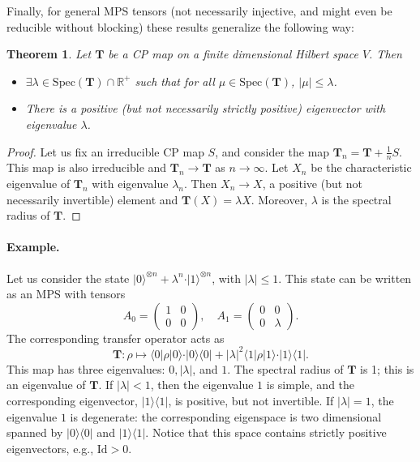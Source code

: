 \documentclass{article}
\newtheorem{theorem}{Theorem}
\newcommand{\id}{\mathrm{Id}}
\newcommand{\ket}[1]{\vert #1 \rangle}
\newcommand{\bra}[1]{\langle #1 \vert}
\begin{document}
Finally, for general MPS tensors (not necessarily injective, and might even be reducible without blocking) these results generalize the  following way:
\begin{theorem}
  Let $\mathbf{T}$ be a CP map on a finite dimensional Hilbert space $V$. Then 
  \begin{itemize}
  \item  $\exists \lambda\in \mathrm{Spec}(\mathbf{T})\cap \mathbb{R}^+$ such that for all $\mu\in \mathrm{Spec}(\mathbf{T})$, $|\mu|\leq \lambda$. 
  \item  There is a positive (but not necessarily strictly positive) eigenvector with eigenvalue $\lambda$. 
  \end{itemize}
\end{theorem}
\begin{proof}
  Let us fix an irreducible CP map $S$, and consider the map $\mathbf{T}_n = \mathbf{T}+\tfrac{1}{n}S$. This map is also irreducible and $\mathbf{T}_n \to \mathbf{T}$ as $n\to \infty$. Let $X_n$ be the characteristic eigenvalue of $\mathbf{T}_n$ with eigenvalue $\lambda_n$. Then $X_n\to X$, a positive (but not necessarily invertible) element and $\mathbf{T}(X) = \lambda X$. Moreover, $\lambda$ is the spectral radius of $\mathbf{T}$. 
\end{proof}


\paragraph{Example.} Let us consider the state $\ket{0}^{\otimes n} + \lambda^n \cdot \ket{1}^{\otimes n}$, with $|\lambda|\leq 1$. This state can be written as an MPS with tensors 
\begin{equation*}
  A_0 = \left(\begin{matrix}
    1 & 0 \\ 0 & 0 
  \end{matrix}\right), \quad 
  A_1 = \left(\begin{matrix}
    0 & 0 \\ 0 & \lambda 
  \end{matrix}\right).
\end{equation*}
The corresponding transfer operator acts as 
\begin{equation*}
  \mathbf{T}: \rho \mapsto \bra{0}\rho\ket{0} \cdot \ket{0}\bra{0} + |\lambda |^2 \bra{1}\rho\ket{1} \cdot \ket{1}\bra{1}.
\end{equation*}
This map has three eigenvalues: $0,|\lambda|$, and $1$. The spectral radius of $\mathbf{T}$ is 1; this is an eigenvalue of $\mathbf{T}$. If $|\lambda|<1$, then the eigenvalue $1$ is simple, and the corresponding eigenvector, $\ket{1}\bra{1}$, is positive, but not invertible. If $|\lambda|=1$, the eigenvalue $1$ is degenerate: the corresponding eigenspace is two dimensional spanned by $\ket{0}\bra{0}$ and $\ket{1}\bra{1}$. Notice that this space contains strictly positive eigenvectors, e.g., $\id>0$.
\end{document}
